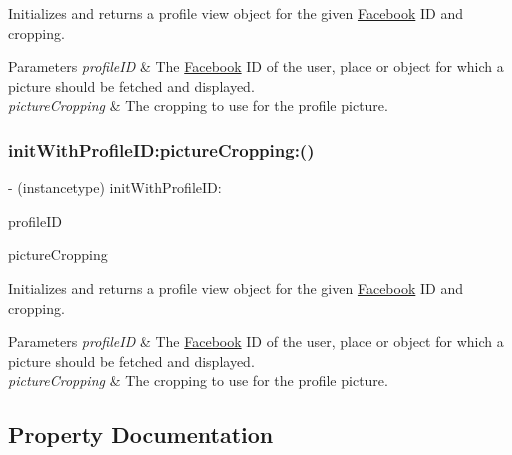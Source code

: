Initializes and returns a profile view object for the given \hyperlink{interfaceFacebook}{Facebook} ID and cropping.


\begin{DoxyParams}{Parameters}
{\em profile\+ID} & The \hyperlink{interfaceFacebook}{Facebook} ID of the user, place or object for which a picture should be fetched and displayed. \\
\hline
{\em picture\+Cropping} & The cropping to use for the profile picture. \\
\hline
\end{DoxyParams}
\mbox{\label{interfaceFBProfilePictureView_ac31bbd3ec87c79d3b1ccd4f3466e46b1}} 
\subsubsection{\texorpdfstring{init\+With\+Profile\+I\+D\+:picture\+Cropping\+:()}{initWithProfileID:pictureCropping:()}\hspace{0.1cm}{\footnotesize\ttfamily [5/5]}}
{\footnotesize\ttfamily -\/ (instancetype) init\+With\+Profile\+I\+D\+: \begin{DoxyParamCaption}\item[{(N\+S\+String $\ast$)}]{profile\+ID }\item[{pictureCropping:(F\+B\+Profile\+Picture\+Cropping)}]{picture\+Cropping }\end{DoxyParamCaption}}

Initializes and returns a profile view object for the given \hyperlink{interfaceFacebook}{Facebook} ID and cropping.


\begin{DoxyParams}{Parameters}
{\em profile\+ID} & The \hyperlink{interfaceFacebook}{Facebook} ID of the user, place or object for which a picture should be fetched and displayed. \\
\hline
{\em picture\+Cropping} & The cropping to use for the profile picture. \\
\hline
\end{DoxyParams}


\subsection{Property Documentation}
\mbox{\label{interfaceFBProfilePictureView_a04f8436a72d2c64e8ef233baebbec56a}} 
